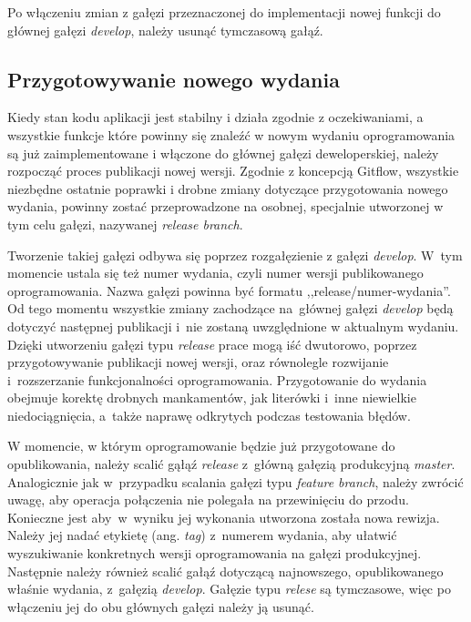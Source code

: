\documentclass[12pt,a4paper,polish,thesis]{dcsbook}
\begin{document}
{	Po włączeniu zmian z gałęzi przeznaczonej do implementacji nowej funkcji do głównej gałęzi \textit{develop}, należy usunąć tymczasową gałąź.

	\subsection{Przygotowywanie nowego wydania}

	Kiedy stan kodu aplikacji jest stabilny i działa zgodnie z oczekiwaniami, a wszystkie funkcje które powinny się znaleźć w nowym wydaniu oprogramowania są już zaimplementowane i włączone do głównej gałęzi deweloperskiej, należy rozpocząć proces publikacji nowej wersji. Zgodnie z koncepcją Gitflow, wszystkie niezbędne ostatnie poprawki i drobne zmiany dotyczące przygotowania nowego wydania, powinny zostać przeprowadzone na osobnej, specjalnie utworzonej w tym celu gałęzi, nazywanej \textit{release branch}.

	Tworzenie takiej gałęzi odbywa się poprzez rozgałęzienie z gałęzi \textit{develop}. W~tym momencie ustala się też numer wydania, czyli numer wersji publikowanego oprogramowania. Nazwa gałęzi powinna być formatu ,,release/numer-wydania''.
	Od tego momentu wszystkie zmiany zachodzące na~głównej gałęzi \textit{develop} będą dotyczyć następnej publikacji i~nie zostaną uwzględnione w aktualnym wydaniu. Dzięki utworzeniu gałęzi typu \textit{release} prace mogą iść dwutorowo,  poprzez przygotowywanie publikacji nowej wersji, oraz równolegle rozwijanie i~rozszerzanie funkcjonalności oprogramowania. Przygotowanie do wydania obejmuje korektę drobnych mankamentów, jak literówki i~inne niewielkie niedociągnięcia, a~także naprawę odkrytych podczas testowania błędów.

	W momencie, w którym oprogramowanie będzie już przygotowane do opublikowania, należy scalić gąłąź \textit{release} z~główną gałęzią produkcyjną \textit{master}. Analogicznie jak w~przypadku scalania gałęzi typu \textit{feature branch}, należy  zwrócić uwagę, aby operacja połączenia nie polegała na przewinięciu do przodu. Konieczne jest aby~w~wyniku jej wykonania utworzona została nowa rewizja. Należy jej nadać etykietę (ang. \textit{tag}) z~numerem wydania, aby ułatwić wyszukiwanie konkretnych wersji oprogramowania na gałęzi produkcyjnej. Następnie należy również scalić gałąź dotyczącą najnowszego, opublikowanego właśnie wydania, z~gałęzią \textit{develop}. Gałęzie typu \textit{relese} są tymczasowe, więc po włączeniu jej do obu głównych gałęzi należy ją usunąć.

}
\end{document}
